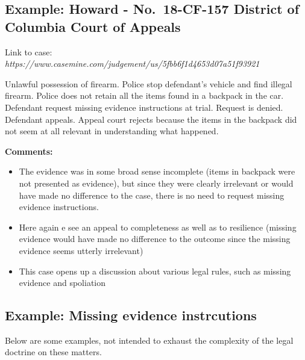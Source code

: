 \documentclass[
  10pt,
  dvipsnames,enabledeprecatedfontcommands]{scrartcl}
\begin{document}
\hypertarget{example-howard---no.-18-cf-157-district-of-columbia-court-of-appeals}{%
\subsection{Example: Howard - No.~18-CF-157 District of Columbia Court
of
Appeals}\label{example-howard---no.-18-cf-157-district-of-columbia-court-of-appeals}}

Link to case:
\textit{https://www.casemine.com/judgement/us/5fbb6f1d4653d07a51f93921}

Unlawful possession of firearm. Police stop defendant's vehicle and find
illegal firearm. Police does not retain all the items found in a
backpack in the car. Defendant request missing evidence instructions at
trial. Request is denied. Defendant appeals. Appeal court rejects
because the items in the backpack did not seem at all relevant in
understanding what happened.

\textbf{Comments:}

\begin{itemize}
\item
  The evidence was in some broad sense incomplete (items in backpack
  were not presented as evidence), but since they were clearly
  irrelevant or would have made no difference to the case, there is no
  need to request missing evidence instructions.
\item
  Here again e see an appeal to completeness as well as to resilience
  (missing evidence would have made no difference to the outcome since
  the missing evidence seems utterly irrelevant)
\item
  This case opens up a discussion about various legal rules, such as
  missing evidence and spoliation
\end{itemize}


\hypertarget{example-missing-evidence-instrcutions}{%
\subsection{Example: Missing evidence
instrcutions}\label{example-missing-evidence-instrcutions}}

Below are some examples, not intended to exhaust the complexity of the
legal doctrine on these matters.
\end{document}
